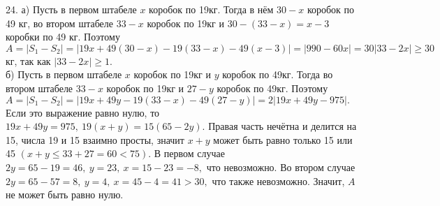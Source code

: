 24. а) Пусть в первом штабеле $x$ коробок по 19кг. Тогда в нём $30-x$ коробок по 49 кг, во втором штабеле $33-x$ коробок по 19кг и $30-(33-x)=x-3$ коробки по 49 кг.
Поэтому $A=|S_1-S_2|=|19x+49(30-x)-19(33-x)-49(x-3)|=|990-60x|=30|33-2x|\geqslant30$кг, так как $|33-2x|\geqslant1.$\\
б) Пусть в первом штабеле $x$ коробок по 19кг и $y$ коробок по 49кг. Тогда во втором штабеле $33-x$ коробок по 19кг и $27-y$ коробок по 49кг. Поэтому
$A=|S_1-S_2|=|19x+49y-19(33-x)-49(27-y)|=2|19x+49y-975|.$ Если это выражение равно нулю, то $19x+49y=975,\ 19(x+y)=15(65-2y).$ Правая часть нечётна и делится на 15, числа 19 и 15 взаимно просты, значит $x+y$ может быть равно только 15 или 45 $(x+y\leqslant33+27=60<75).$ В первом случае $2y=65-19=46,\ y=23,\ x=15-23=-8,$ что невозможно. Во втором случае $2y=65-57=8,\ y=4,\ x=45-4=41>30,$ что также невозможно. Значит, $A$ не может быть равно нулю.\\
